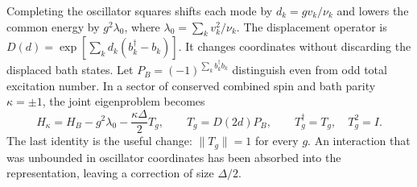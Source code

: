 Completing the oscillator squares shifts each mode by $d_k=gv_k/\nu_k$ and lowers the common energy by $g^2\lambda_0$, where $\lambda_0=\sum_kv_k^2/\nu_k$. The displacement operator is
$D(d)=\exp[\sum_kd_k(b_k^\dagger-b_k)]$. It changes coordinates without discarding the displaced bath states. Let $P_B=(-1)^{\sum_k b_k^\dagger b_k}$ distinguish even from odd total excitation number. In a sector of conserved combined spin and bath parity $\kappa=\pm1$, the joint eigenproblem becomes
\begin{equation}
 H_\kappa=H_B-g^2\lambda_0-\frac{\kappa\Delta}{2}T_g,
 \qquad T_g=D(2d)P_B,
 \qquad T_g^\dagger=T_g,\quad T_g^2=I.
 \label{eq:hmf-bounded-tunnelling}
\end{equation}
The last identity is the useful change: $\|T_g\|=1$ for every $g$. An interaction that was unbounded in oscillator coordinates has been absorbed into the representation, leaving a correction of size $\Delta/2$.

